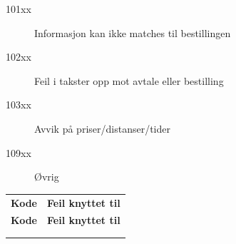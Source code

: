 \documentclass[a4paper,titlepage,norsk,11pt]{article}
\begin{document}
\begin{description}
  \item[101xx] Informasjon kan ikke matches til bestillingen
  \item[102xx] Feil i takster opp mot avtale eller bestilling
  \item[103xx] Avvik på priser/distanser/tider
  \item[109xx] Øvrig
\end{description}

\begin{longtabu}to 
\tabucline{-}
\textbf{Kode} & \textbf{Feil knyttet til} \\
\tabucline{-}
\endfirsthead
\tabucline{-}
\textbf{Kode} & \textbf{Feil knyttet til} \\
\tabucline{-}
\endhead
{} \\
\endfoot
\endlastfoot


\end{longtabu}
\end{document}
